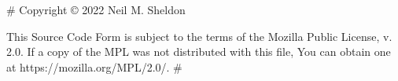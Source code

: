 {#
    Copyright © 2022 Neil M. Sheldon
    
    This Source Code Form is subject to the terms of the Mozilla Public
    License, v. 2.0. If a copy of the MPL was not distributed with this
    file, You can obtain one at https://mozilla.org/MPL/2.0/.
#}{%
\begin{dnd5eStatBlock}
\rpgCreatureHeading{{ "{" ~ name ~ "}"}}{{ "{" ~ size ~ "}" }}{{ "{" ~ type}} {%

\dndTaperedRule{}

\rpgCreatureStat{Armor Class}{{ "{" ~ armor ~ "}" }}
    
\rpgCreatureStat{Hit Points}{{ "{" ~ hit_points ~ "}" }}
    
\rpgCreatureStat{Speed}{{ "{" ~ speed ~ "}" }}

\dndTaperedRule{}

\begin{dnd5eAbilitiesTable}
{{ strength }} & {{dexterity}} & {{constitution}} & {{intelligence}} & {{wisdom}} & {{charisma}}
\end{dnd5eAbilitiesTable}

\dndTaperedRule{}

{%

{%

{%

{%

{%

{%

{%

{%

\rpgCreatureStat{Challenge}{{ "{" ~  challenge_rating  ~ "}" }}
    
}}}}}}}}}}
\end{dnd5eStatBlock}}
